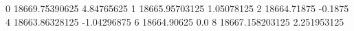 0 18669.75390625 4.84765625
1 18665.95703125 1.05078125
2 18664.71875 -0.1875
4 18663.86328125 -1.04296875
6 18664.90625 0.0
8 18667.158203125 2.251953125
